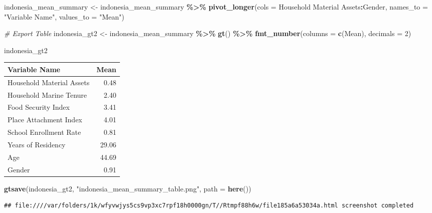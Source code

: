 \documentclass[
]{article}
\newenvironment{Shaded}{\begin{snugshade}}{\end{snugshade}}
\newcommand{\AttributeTok}[1]{\textcolor[rgb]{0.13,0.29,0.53}{#1}}
\newcommand{\CommentTok}[1]{\textcolor[rgb]{0.56,0.35,0.01}{\textit{#1}}}
\newcommand{\DecValTok}[1]{\textcolor[rgb]{0.00,0.00,0.81}{#1}}
\newcommand{\FunctionTok}[1]{\textcolor[rgb]{0.13,0.29,0.53}{\textbf{#1}}}
\newcommand{\NormalTok}[1]{#1}
\newcommand{\OtherTok}[1]{\textcolor[rgb]{0.56,0.35,0.01}{#1}}
\newcommand{\SpecialCharTok}[1]{\textcolor[rgb]{0.81,0.36,0.00}{\textbf{#1}}}
\newcommand{\StringTok}[1]{\textcolor[rgb]{0.31,0.60,0.02}{#1}}
\begin{document}
\begin{Shaded}
\begin{Highlighting}[]
\NormalTok{indonesia\_mean\_summary }\OtherTok{\textless{}{-}}\NormalTok{ indonesia\_mean\_summary }\SpecialCharTok{\%\textgreater{}\%} 
  \FunctionTok{pivot\_longer}\NormalTok{(}\AttributeTok{cols =} \StringTok{\textasciigrave{}}\AttributeTok{Household Material Assets}\StringTok{\textasciigrave{}}\SpecialCharTok{:}\NormalTok{Gender,}
               \AttributeTok{names\_to =} \StringTok{"Variable Name"}\NormalTok{,}
               \AttributeTok{values\_to =} \StringTok{"Mean"}\NormalTok{)}

\CommentTok{\# Export Table}
\NormalTok{indonesia\_gt2 }\OtherTok{\textless{}{-}}\NormalTok{ indonesia\_mean\_summary }\SpecialCharTok{\%\textgreater{}\%} \FunctionTok{gt}\NormalTok{() }\SpecialCharTok{\%\textgreater{}\%} 
  \FunctionTok{fmt\_number}\NormalTok{(}\AttributeTok{columns =} \FunctionTok{c}\NormalTok{(Mean),}
             \AttributeTok{decimals =} \DecValTok{2}\NormalTok{)}

\NormalTok{indonesia\_gt2}
\end{Highlighting}
\end{Shaded}

\begin{table}[!t]
\fontsize{12.0pt}{14.4pt}\selectfont
\begin{tabular*}{\linewidth}{@{\extracolsep{\fill}}lr}
\toprule
Variable Name & Mean \\ 
\midrule\addlinespace[2.5pt]
Household Material Assets & 0.48 \\ 
Household Marine Tenure & 2.40 \\ 
Food Security Index & 3.41 \\ 
Place Attachment Index & 4.01 \\ 
School Enrollment Rate & 0.81 \\ 
Years of Residency & 29.06 \\ 
Age & 44.69 \\ 
Gender & 0.91 \\ 
\bottomrule
\end{tabular*}
\end{table}

\begin{Shaded}
\begin{Highlighting}[]
\FunctionTok{gtsave}\NormalTok{(indonesia\_gt2,}
       \StringTok{"indonesia\_mean\_summary\_table.png"}\NormalTok{,}
       \AttributeTok{path =} \FunctionTok{here}\NormalTok{())}
\end{Highlighting}
\end{Shaded}

\begin{verbatim}
## file:////var/folders/1k/wfyvwjys5cs9vp3xc7rpf18h0000gn/T//Rtmpf88h6w/file185a6a53034a.html screenshot completed
\end{verbatim}
\end{document}
